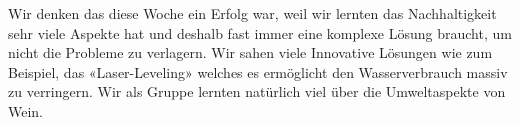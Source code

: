 Wir denken das diese Woche ein Erfolg war, weil wir lernten das Nachhaltigkeit sehr viele Aspekte hat und deshalb fast immer eine komplexe Lösung braucht, um nicht die Probleme zu verlagern. Wir sahen viele Innovative Lösungen wie zum Beispiel, das «Laser-Leveling» welches es ermöglicht den Wasserverbrauch massiv zu verringern. Wir als Gruppe lernten natürlich viel über die Umweltaspekte von Wein.
